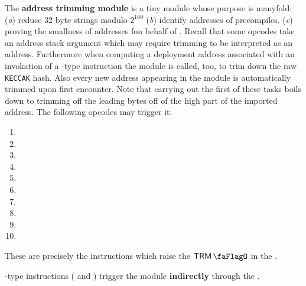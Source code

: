 The \textbf{address trimming module} is a tiny module whose purpose is manyfold:
(\emph{a})
reduce 32 byte strings modulo $2^{160}$
(\emph{b})
identify addresses of precompiles.
(\emph{c})
proving the smallness of addresses fon behalf of \rlpTxnMod{}.
Recall that some opcodes take an address stack argument which may require trimming to be interpreted as an address.
Furthermore when computing a deployment address associated with an invokation of a -type instruction the \rlpAddrMod{} module is called, too, to trim down the raw \texttt{KECCAK} hash.
Also every new address appearing in the \hubMod{} module is automatically trimmed upon first encounter.
Note that carrying out the first of these tasks boils down to trimming off the leading bytes off of the high part of the imported address. The following opcodes may trigger it:
\begin{multicols}{4}
\begin{enumerate}
	\item {}
	\item {}
	\item {}
	\item {}
	\item {}
	\item {}
	\item {}
	\item {}
	\item {}
	\item[\vspace{\fill}]
\end{enumerate}
\end{multicols}
These are precisely the instructions which raise the $\trmFlag$ in the \hubMod{}.

\saNote{} -type instructions ( and ) trigger the \trmMod{} module \textbf{indirectly} through the \rlpAddrMod{}.
